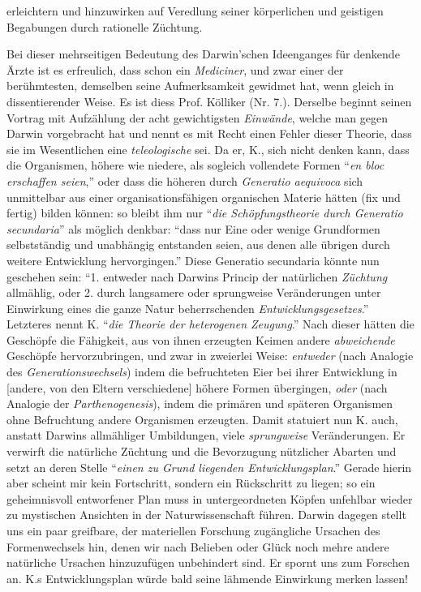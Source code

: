 \documentclass[a4paper, 11pt, oneside, english]{article}
\begin{document}
erleichtern und hinzuwirken auf Veredlung seiner körperlichen und geistigen Begabungen durch rationelle Züchtung.

Bei dieser mehrseitigen Bedeutung des Darwin'schen Ideenganges für denkende Ärzte ist es erfreulich, dass schon ein \emph{Mediciner}, und zwar einer der berühmtesten, demselben seine Aufmerksamkeit gewidmet hat, wenn gleich in dissentierender Weise. Es ist diess Prof. Kölliker (Nr. 7.). Derselbe beginnt seinen Vortrag mit Aufzählung der acht gewichtigsten \emph{Einwände}, welche man gegen Darwin vorgebracht hat und nennt es mit Recht einen Fehler dieser Theorie, dass sie im Wesentlichen eine \emph{teleologische} sei. Da er, K., sich nicht denken kann, dass die Organismen, höhere wie niedere, als sogleich vollendete Formen "`\emph{en bloc erschaffen seien},"' oder dass die höheren durch \emph{Generatio aequivoca} sich unmittelbar aus einer organisationsfähigen organischen Materie hätten (fix und fertig) bilden können: so bleibt ihm nur "`\emph{die Schöpfungstheorie durch Generatio secundaria}"' als möglich denkbar: "`dass nur Eine oder wenige Grundformen selbstständig und unabhängig entstanden seien, aus denen alle übrigen durch weitere Entwicklung hervorgingen."' Diese Generatio secundaria könnte nun geschehen sein: "`1. entweder nach Darwins Princip der natürlichen \emph{Züchtung} allmählig, oder 2. durch langsamere oder sprungweise Veränderungen unter Einwirkung eines die ganze Natur beherrschenden \emph{Entwicklungsgesetzes}."' Letzteres nennt K. "`\emph{die Theorie der heterogenen Zeugung}."' Nach dieser hätten die Geschöpfe die Fähigkeit, aus von ihnen erzeugten Keimen andere \emph{abweichende} Geschöpfe hervorzubringen, und zwar in zweierlei Weise: \emph{entweder} (nach Analogie des \emph{Generationswechsels}) indem die befruchteten Eier bei ihrer Entwicklung in [andere, von den Eltern verschiedene] höhere Formen übergingen, \emph{oder} (nach Analogie der \emph{Parthenogenesis}), indem die primären und späteren Organismen ohne Befruchtung andere Organismen erzeugten. Damit statuiert nun K. auch, anstatt Darwins allmähliger Umbildungen, viele \emph{sprungweise} Veränderungen. Er verwirft die natürliche Züchtung und die Bevorzugung nützlicher Abarten und setzt an deren Stelle "`\emph{einen zu Grund liegenden Entwicklungsplan}."' Gerade hierin aber scheint mir kein Fortschritt, sondern ein Rückschritt zu liegen; so ein geheimnisvoll entworfener Plan muss in untergeordneten Köpfen unfehlbar wieder zu mystischen Ansichten in der Naturwissenschaft führen. Darwin dagegen stellt uns ein paar greifbare, der materiellen Forschung zugängliche Ursachen des Formenwechsels hin, denen wir nach Belieben oder Glück noch mehre andere natürliche Ursachen hinzuzufügen unbehindert sind. Er spornt uns zum Forschen an. K.s Entwicklungsplan würde bald seine lähmende Einwirkung merken lassen!
\end{document}
